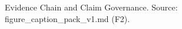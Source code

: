 ﻿%
\nonfinalnote


\begin{figure}[htbp]
\centering
{}
\caption{Evidence Chain and Claim Governance. Source: figure\_caption\_pack\_v1.md (F2).}
\label{fig:evidence_chain}
\end{figure}


